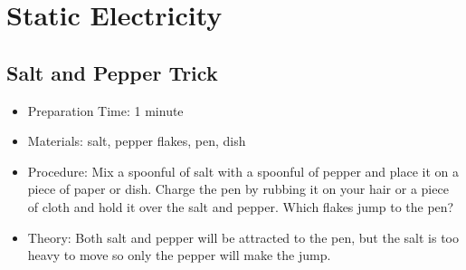 \section{Static Electricity}

\subsection{Salt and Pepper Trick}
\begin{itemize}
\item{Preparation Time: 1 minute}
\item{Materials: salt, pepper flakes, pen, dish}
\item{Procedure: Mix a spoonful of salt with a spoonful of pepper and place it on a piece of paper or dish. Charge the pen by rubbing it on your hair or a piece of cloth and hold it over the salt and pepper. Which flakes jump to the pen?}
\item{Theory: Both salt and pepper will be attracted to the pen, but the salt is too heavy to move so only the pepper will make the jump.}
\end{itemize}

